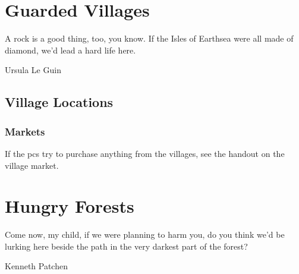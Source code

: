 \documentclass[a4paper,openany]{book}
\begin{document}
\stopcontents[Town]

\stopcontents[sq]

\chapter{Guarded Villages}
\epigraph{A rock is a good thing, too, you know. If the Isles of Earthsea were all made of diamond, we'd lead a hard life here.}{Ursula Le Guin}

\section{Village Locations}

\begin{multicols}{2}

\subsection{Markets}

If the \glspl{pc} try to purchase anything from the villages, see the handout on the village market.

%
%
%



\end{multicols}





%

%

%

%



\chapter{Hungry Forests}
\epigraph{Come now, my child, if we were planning to harm you, do you think we'd be lurking here beside the path in the very darkest part of the forest?}{Kenneth Patchen}
\end{document}

